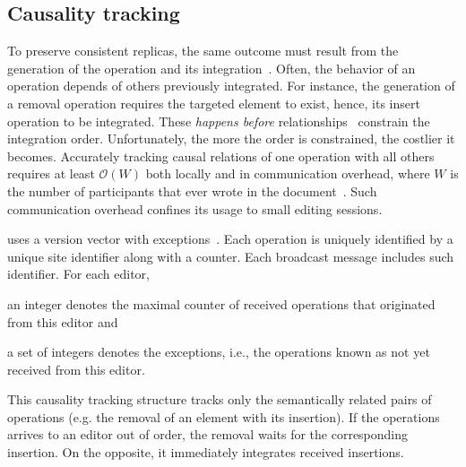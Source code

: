 

\subsection{Causality tracking}
\label{subsec:causality}

To preserve consistent replicas, the same outcome must result from the
generation of the operation and its integration~\cite{sun1998achieving}. Often,
the behavior of an operation depends of others previously integrated. For
instance, the generation of a removal operation requires the targeted element to
exist, hence, its insert operation to be integrated. These \emph{happens before}
relationships~\cite{lamport1978time} constrain the integration order.
Unfortunately, the more the order is constrained, the costlier it
becomes. Accurately tracking causal relations of one operation with all others
requires at least $\mathcal{O}(W)$ both locally and in communication overhead,
where $W$ is the number of participants that ever wrote in the
document~\cite{charronbost1991concerning}. Such communication overhead confines
its usage to small editing sessions.

\CRATE uses a version vector with exceptions~\cite{malkhi2007concise,
  mukund2014optimized}. Each operation is uniquely identified by a unique site
identifier along with a counter. Each broadcast message includes such
identifier. For each editor,
\begin{inparaenum}[(i)]
\item an integer denotes the maximal counter of received operations that
  originated from this editor and
\item a set of integers denotes the exceptions, i.e., the operations known as
  not yet received from this editor.
\end{inparaenum}

This causality tracking structure tracks only the semantically related pairs of
operations (e.g. the removal of an element with its insertion). If the
operations arrives to an editor out of order, the removal waits for the
corresponding insertion. On the opposite, it immediately integrates received
insertions.




